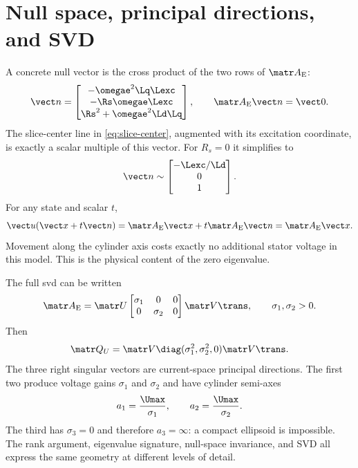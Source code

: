 \section{Null space, principal directions, and SVD}

A concrete null vector is the cross product of the two rows of $\Ae$:
\begin{equation}
 \vect n=\begin{bmatrix}
 -\omegae^2\Lq\Lexc\\
 -\Rs\omegae\Lexc\\
 \Rs^2+\omegae^2\Ld\Lq
 \end{bmatrix},\qquad \Ae\vect n=\vect0.\label{eq:general-null}
\end{equation}
The slice-center line in \cref{eq:slice-center}, augmented with its excitation
coordinate, is exactly a scalar multiple of this vector.  For $R_s=0$ it
simplifies to
\begin{equation}
 \vect n\sim\begin{bmatrix}-\Lexc/\Ld\\0\\1\end{bmatrix}.
 \label{eq:ideal-null}
\end{equation}
For any state and scalar $t$,
\begin{equation}
 \vect u(\state+t\vect n)=\Ae\state+t\Ae\vect n=\Ae\state.
 \label{eq:null-invariance}
\end{equation}
Movement along the cylinder axis costs exactly no additional stator voltage in
this model.  This is the physical content of the zero eigenvalue.




The full \gls{svd} can be written
\begin{equation}
 \Ae=\matr U
 \begin{bmatrix}\sigma_1&0&0\\0&\sigma_2&0\end{bmatrix}
 \matr V\trans,
 \qquad \sigma_1,\sigma_2>0.
\end{equation}
Then
\begin{equation}
 \Qu=\matr V\diag(\sigma_1^2,\sigma_2^2,0)\matr V\trans.
\end{equation}
The three right singular vectors are current-space principal directions.  The
first two produce voltage gains $\sigma_1$ and $\sigma_2$ and have cylinder
semi-axes
\begin{equation}
 a_1=\frac{\Umax}{\sigma_1},\qquad
 a_2=\frac{\Umax}{\sigma_2}.
\end{equation}
The third has $\sigma_3=0$ and therefore $a_3=\infty$: a compact ellipsoid is
impossible.  The rank argument, eigenvalue signature, null-space invariance,
and SVD all express the same geometry at different levels of detail.

